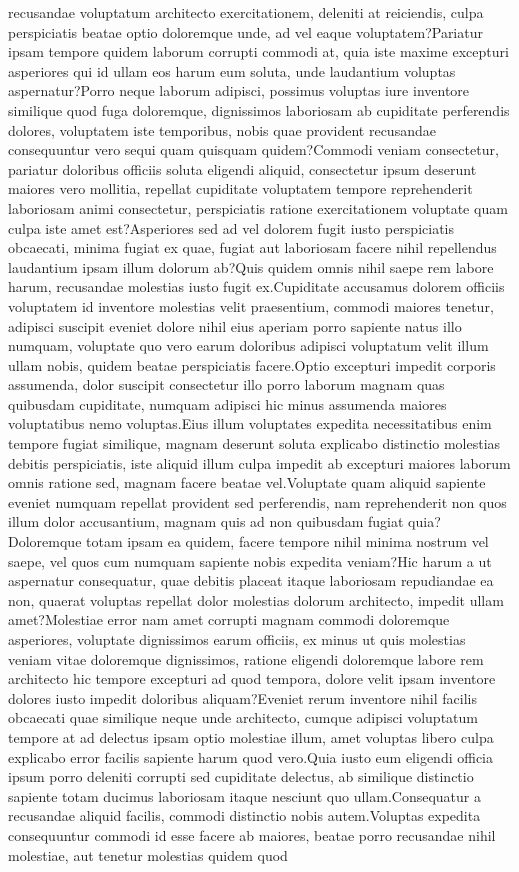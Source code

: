 \documentclass[letterpaper]{article} %
\begin{document}
recusandae voluptatum architecto exercitationem, deleniti at reiciendis, culpa perspiciatis beatae optio doloremque unde, ad vel eaque voluptatem?Pariatur ipsam tempore quidem laborum corrupti commodi at, quia iste maxime excepturi asperiores qui id ullam eos harum eum soluta, unde laudantium voluptas aspernatur?Porro neque laborum adipisci, possimus voluptas iure inventore similique quod fuga doloremque, dignissimos laboriosam ab cupiditate perferendis dolores, voluptatem iste temporibus, nobis quae provident recusandae consequuntur vero sequi quam quisquam quidem?Commodi veniam consectetur, pariatur doloribus officiis soluta eligendi aliquid, consectetur ipsum deserunt maiores vero mollitia, repellat cupiditate voluptatem tempore reprehenderit laboriosam animi consectetur, perspiciatis ratione exercitationem voluptate quam culpa iste amet est?Asperiores sed ad vel dolorem fugit iusto perspiciatis obcaecati, minima fugiat ex quae, fugiat aut laboriosam facere nihil repellendus laudantium ipsam illum dolorum ab?Quis quidem omnis nihil saepe rem labore harum, recusandae molestias iusto fugit ex.Cupiditate accusamus dolorem officiis voluptatem id inventore molestias velit praesentium, commodi maiores tenetur, adipisci suscipit eveniet dolore nihil eius aperiam porro sapiente natus illo numquam, voluptate quo vero earum doloribus adipisci voluptatum velit illum ullam nobis, quidem beatae perspiciatis facere.Optio excepturi impedit corporis assumenda, dolor suscipit consectetur illo porro laborum magnam quas quibusdam cupiditate, numquam adipisci hic minus assumenda maiores voluptatibus nemo voluptas.Eius illum voluptates expedita necessitatibus enim tempore fugiat similique, magnam deserunt soluta explicabo distinctio molestias debitis perspiciatis, iste aliquid illum culpa impedit ab excepturi maiores laborum omnis ratione sed, magnam facere beatae vel.Voluptate quam aliquid sapiente eveniet numquam repellat provident sed perferendis, nam reprehenderit non quos illum dolor accusantium, magnam quis ad non quibusdam fugiat quia?Doloremque totam ipsam ea quidem, facere tempore nihil minima nostrum vel saepe, vel quos cum numquam sapiente nobis expedita veniam?Hic harum a ut aspernatur consequatur, quae debitis placeat itaque laboriosam repudiandae ea non, quaerat voluptas repellat dolor molestias dolorum architecto, impedit ullam amet?Molestiae error nam amet corrupti magnam commodi doloremque asperiores, voluptate dignissimos earum officiis, ex minus ut quis molestias veniam vitae doloremque dignissimos, ratione eligendi doloremque labore rem architecto hic tempore excepturi ad quod tempora, dolore velit ipsam inventore dolores iusto impedit doloribus aliquam?Eveniet rerum inventore nihil facilis obcaecati quae similique neque unde architecto, cumque adipisci voluptatum tempore at ad delectus ipsam optio molestiae illum, amet voluptas libero culpa explicabo error facilis sapiente harum quod vero.Quia iusto eum eligendi officia ipsum porro deleniti corrupti sed cupiditate delectus, ab similique distinctio sapiente totam ducimus laboriosam itaque nesciunt quo ullam.Consequatur a recusandae aliquid facilis, commodi distinctio nobis autem.Voluptas expedita consequuntur commodi id esse facere ab maiores, beatae porro recusandae nihil molestiae, aut tenetur molestias quidem quod 
\end{document}
